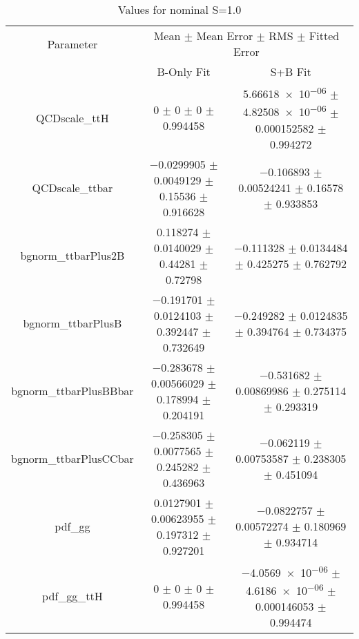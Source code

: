 \begin{table}
\centering
\caption{Values for nominal S=1.0}
\begin{tabular}{ccc}
\toprule
Parameter & \multicolumn{2}{c}{Mean $\pm$ Mean Error $\pm$ RMS $\pm$ Fitted Error}\\
 & B-Only Fit & S+B Fit\\
\midrule
QCDscale\_ttH & \num{0} $\pm$ \num{0} $\pm$ \num{0} $\pm$ \num{0.994458} & \num{5.66618e-06} $\pm$ \num{4.82508e-06} $\pm$ \num{0.000152582} $\pm$ \num{0.994272}\\
QCDscale\_ttbar & \num{-0.0299905} $\pm$ \num{0.0049129} $\pm$ \num{0.15536} $\pm$ \num{0.916628} & \num{-0.106893} $\pm$ \num{0.00524241} $\pm$ \num{0.16578} $\pm$ \num{0.933853}\\
bgnorm\_ttbarPlus2B & \num{0.118274} $\pm$ \num{0.0140029} $\pm$ \num{0.44281} $\pm$ \num{0.72798} & \num{-0.111328} $\pm$ \num{0.0134484} $\pm$ \num{0.425275} $\pm$ \num{0.762792}\\
bgnorm\_ttbarPlusB & \num{-0.191701} $\pm$ \num{0.0124103} $\pm$ \num{0.392447} $\pm$ \num{0.732649} & \num{-0.249282} $\pm$ \num{0.0124835} $\pm$ \num{0.394764} $\pm$ \num{0.734375}\\
bgnorm\_ttbarPlusBBbar & \num{-0.283678} $\pm$ \num{0.00566029} $\pm$ \num{0.178994} $\pm$ \num{0.204191} & \num{-0.531682} $\pm$ \num{0.00869986} $\pm$ \num{0.275114} $\pm$ \num{0.293319}\\
bgnorm\_ttbarPlusCCbar & \num{-0.258305} $\pm$ \num{0.0077565} $\pm$ \num{0.245282} $\pm$ \num{0.436963} & \num{-0.062119} $\pm$ \num{0.00753587} $\pm$ \num{0.238305} $\pm$ \num{0.451094}\\
pdf\_gg & \num{0.0127901} $\pm$ \num{0.00623955} $\pm$ \num{0.197312} $\pm$ \num{0.927201} & \num{-0.0822757} $\pm$ \num{0.00572274} $\pm$ \num{0.180969} $\pm$ \num{0.934714}\\
pdf\_gg\_ttH & \num{0} $\pm$ \num{0} $\pm$ \num{0} $\pm$ \num{0.994458} & \num{-4.0569e-06} $\pm$ \num{4.6186e-06} $\pm$ \num{0.000146053} $\pm$ \num{0.994474}\\
\bottomrule
\end{tabular}
\end{table}